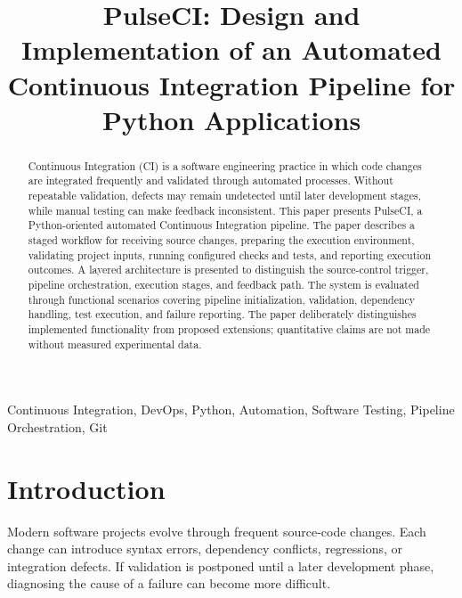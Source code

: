 \documentclass[conference]{IEEEtran}
\begin{document}
\title{PulseCI: Design and Implementation of an Automated Continuous Integration Pipeline for Python Applications}

\author{
}
\maketitle

\begin{abstract}
Continuous Integration (CI) is a software engineering practice in which code changes are integrated frequently and validated through automated processes. Without repeatable validation, defects may remain undetected until later development stages, while manual testing can make feedback inconsistent. This paper presents PulseCI, a Python-oriented automated Continuous Integration pipeline. The paper describes a staged workflow for receiving source changes, preparing the execution environment, validating project inputs, running configured checks and tests, and reporting execution outcomes. A layered architecture is presented to distinguish the source-control trigger, pipeline orchestration, execution stages, and feedback path. The system is evaluated through functional scenarios covering pipeline initialization, validation, dependency handling, test execution, and failure reporting. The paper deliberately distinguishes implemented functionality from proposed extensions; quantitative claims are not made without measured experimental data.
\end{abstract}

\begin{IEEEkeywords}
Continuous Integration, DevOps, Python, Automation, Software Testing, Pipeline Orchestration, Git
\end{IEEEkeywords}

\section{Introduction}
Modern software projects evolve through frequent source-code changes. Each change can introduce syntax errors, dependency conflicts, regressions, or integration defects. If validation is postponed until a later development phase, diagnosing the cause of a failure can become more difficult.
\end{document}
